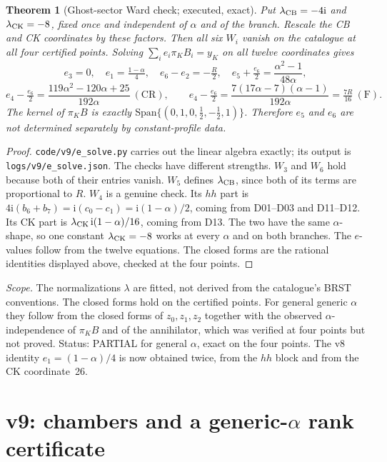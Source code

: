 \documentclass[11pt,a4paper]{article}
\newcommand{\ii}{\mathrm i}
\newcommand{\Fr}{\mathrm F}
\newcommand{\CR}{\mathrm{CR}}
\newcommand{\loc}[1]{\nolinkurl{#1}}
\newcommand{\PARTIAL}{\textsf{PARTIAL}}
\newcommand{\Span}{\mathrm{Span}}
\theoremstyle{plain}
\newtheorem{theorem}{Theorem}[section]
\theoremstyle{definition}
\theoremstyle{remark}
\numberwithin{equation}{section}
\begin{document}
\begin{theorem}[Ghost-sector Ward check; executed, exact]
\label{thm:v9ghost}
Put \(\lambda_{\rm CB}=-4\ii\) and \(\lambda_{\rm CK}=-8\), fixed
once and independent of \(\alpha\) and of the branch. Rescale the
CB and CK coordinates by these factors. Then all six \(W_i\)
vanish on the catalogue at all four certified points. Solving
\(\sum_ie_i\pi_KB_i=y_K\) on all twelve coordinates gives
\[
 e_3=0,\quad e_1=\tfrac{1-\alpha}4,\quad
 e_6-e_2=-\tfrac R2,\quad
 e_5+\tfrac{e_6}2=\frac{\alpha^2-1}{48\alpha},
\]
\[
 e_4-\tfrac{e_6}2=\frac{119\alpha^2-120\alpha+25}{192\alpha}\ (\CR),\qquad
 e_4-\tfrac{e_6}2=\frac{7(17\alpha-7)(\alpha-1)}{192\alpha}=\tfrac{7R}{16}\ (\Fr).
\]
The kernel of \(\pi_KB\) is exactly
\(\Span\{(0,1,0,\tfrac12,-\tfrac12,1)\}\). Therefore \(e_5\) and
\(e_6\) are not determined separately by constant-profile data.
\end{theorem}

\begin{proof}
\loc{code/v9/e_solve.py} carries out the linear algebra exactly; its output is
\loc{logs/v9/e_solve.json}. The checks have different strengths.
\(W_3\) and \(W_6\) hold because both of their entries vanish.
\(W_5\) defines \(\lambda_{\rm CB}\), since both of its terms are
proportional to \(R\).
\(W_4\) is a genuine check. Its \(hh\) part is
\(4\ii(b_6+b_7)=\ii(c_0-c_1)=\ii(1-\alpha)/2\), coming from
D01--D03 and D11--D12. Its CK part is
\(\lambda_{\rm CK}\,\ii(1-\alpha)/16\), coming from D13. The two
have the same \(\alpha\)-shape, so one constant
\(\lambda_{\rm CK}=-8\) works at every \(\alpha\) and on both
branches. The \(e\)-values follow from the twelve equations. The
closed forms are the rational identities displayed above,
checked at the four points.
\end{proof}

\noindent\emph{Scope.} The normalizations \(\lambda\) are fitted,
not derived from the catalogue's BRST conventions. The closed
forms hold on the certified points. For general generic \(\alpha\)
they follow from the closed forms of \(z_0,z_1,z_2\) together with
the observed \(\alpha\)-independence of \(\pi_KB\) and of the
annihilator, which was verified at four points but not proved.
Status: \PARTIAL{} for general \(\alpha\), exact on the four points.
The v8 identity \(e_1=(1-\alpha)/4\) is now obtained twice, from
the \(hh\) block and from the CK coordinate~26.

\section{v9: chambers and a generic-\texorpdfstring{\(\alpha\)}{alpha} rank certificate}
\label{sec:v9chamber}
\end{document}
